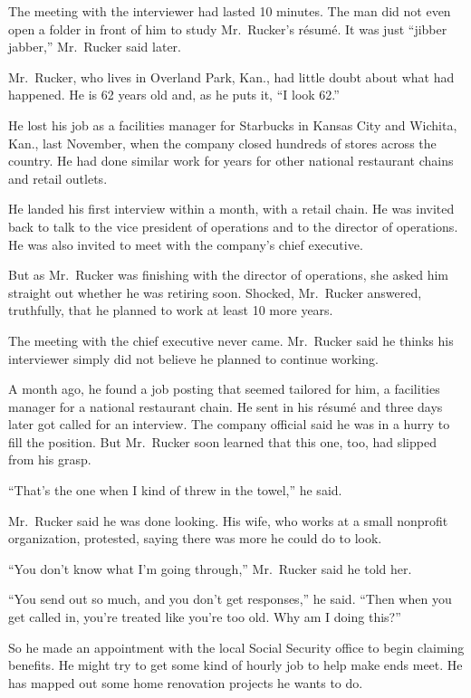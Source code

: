﻿\documentclass[12pt]{article}
\begin{document}
The meeting with the interviewer had lasted 10 minutes. The man did not even open a folder in front
of him to study Mr.~Rucker's r\'esum\'e. It was just ``jibber jabber,'' Mr.~Rucker said later.

Mr.~Rucker, who lives in Overland Park, Kan., had little doubt about what had happened. He is 62
years old and, as he puts it, ``I look 62.''

He lost his job as a facilities manager for Starbucks in Kansas City and Wichita, Kan., last
November, when the company closed hundreds of stores across the country. He had done similar work
for years for other national restaurant chains and retail outlets.

He landed his first interview within a month, with a retail chain. He was invited back to talk to
the vice president of operations and to the director of operations. He was also invited to meet with
the company's chief executive.

But as Mr.~Rucker was finishing with the director of operations, she asked him straight out whether
he was retiring soon. Shocked, Mr.~Rucker answered, truthfully, that he planned to work at least 10
more years.

The meeting with the chief executive never came. Mr.~Rucker said he thinks his interviewer simply
did not believe he planned to continue working.

A month ago, he found a job posting that seemed tailored for him, a facilities manager for a
national restaurant chain. He sent in his r\'esum\'e and three days later got called for an
interview. The company official said he was in a hurry to fill the position. But Mr.~Rucker soon
learned that this one, too, had slipped from his grasp.

``That's the one when I kind of threw in the towel,'' he said.

Mr.~Rucker said he was done looking. His wife, who works at a small nonprofit organization,
protested, saying there was more he could do to look.

``You don't know what I'm going through,'' Mr.~Rucker said he told her.

``You send out so much, and you don't get responses,'' he said. ``Then when you get called in,
you're treated like you're too old. Why am I doing this?''

So he made an appointment with the local Social Security office to begin claiming benefits. He might
try to get some kind of hourly job to help make ends meet. He has mapped out some home renovation
projects he wants to do.
\end{document}
